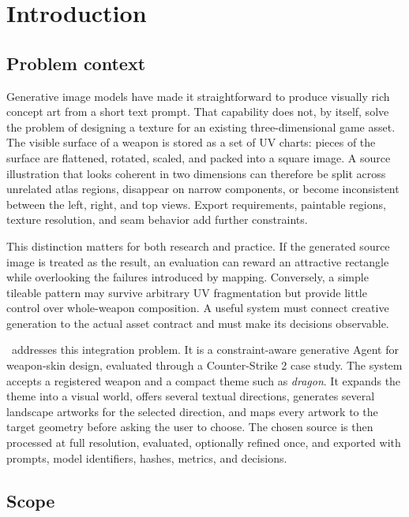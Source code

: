 \section{Introduction}
\label{sec:introduction}

\subsection{Problem context}

Generative image models have made it straightforward to produce visually rich
concept art from a short text prompt. That capability does not, by itself, solve
the problem of designing a texture for an existing three-dimensional game asset.
The visible surface of a weapon is stored as a set of UV charts: pieces of the
surface are flattened, rotated, scaled, and packed into a square image. A source
illustration that looks coherent in two dimensions can therefore be split across
unrelated atlas regions, disappear on narrow components, or become inconsistent
between the left, right, and top views. Export requirements, paintable regions,
texture resolution, and seam behavior add further constraints.

This distinction matters for both research and practice. If the generated source
image is treated as the result, an evaluation can reward an attractive rectangle
while overlooking the failures introduced by mapping. Conversely, a simple
tileable pattern may survive arbitrary UV fragmentation but provide little control
over whole-weapon composition. A useful system must connect creative generation to
the actual asset contract and must make its decisions observable.

\skinsmith\ addresses this integration problem. It is a constraint-aware
generative Agent for weapon-skin design, evaluated through a Counter-Strike 2
case study. The system accepts a registered weapon and a compact theme such as
\emph{dragon}. It expands the theme into a visual world, offers several textual
directions, generates several landscape artworks for the selected direction, and
maps every artwork to the target geometry before asking the user to choose. The
chosen source is then processed at full resolution, evaluated, optionally refined
once, and exported with prompts, model identifiers, hashes, metrics, and decisions.

\subsection{Scope}

